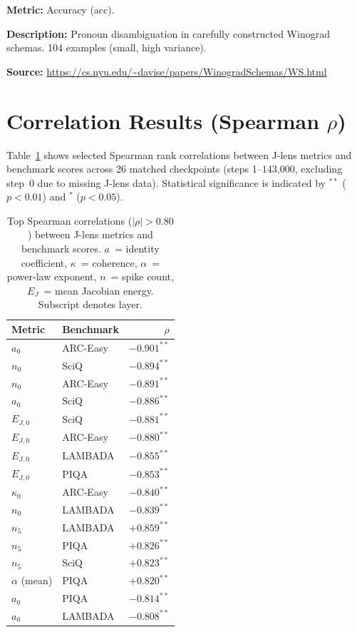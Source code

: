 \documentclass[11pt,a4paper]{article}
\begin{document}
\textbf{Metric:} Accuracy (acc).

\textbf{Description:} Pronoun disambiguation in carefully constructed Winograd schemas. 104 examples (small, high variance).

\textbf{Source:} \url{https://cs.nyu.edu/~davise/papers/WinogradSchemas/WS.html}

\section{Correlation Results (Spearman $\rho$)}

Table~\ref{tab:correlations} shows selected Spearman rank correlations between J-lens metrics and benchmark scores across 26 matched checkpoints (steps 1--143,000, excluding step~0 due to missing J-lens data). Statistical significance is indicated by $^{**}$ ($p < 0.01$) and $^{*}$ ($p < 0.05$).

\begin{table}[H]
\centering
\caption{Top Spearman correlations ($|\rho| > 0.80$) between J-lens metrics and benchmark scores. $a$~= identity coefficient, $\kappa$~= coherence, $\alpha$~= power-law exponent, $n$~= spike count, $E_J$~= mean Jacobian energy. Subscript denotes layer.}
\label{tab:correlations}
\begin{tabular}{llr}
\toprule
Metric & Benchmark & $\rho$ \\
\midrule
$a_0$      & ARC-Easy      & $-0.901^{**}$ \\
$n_0$      & SciQ          & $-0.894^{**}$ \\
$n_0$      & ARC-Easy      & $-0.891^{**}$ \\
$a_0$      & SciQ          & $-0.886^{**}$ \\
$E_{J,0}$  & SciQ          & $-0.881^{**}$ \\
$E_{J,0}$  & ARC-Easy      & $-0.880^{**}$ \\
$E_{J,0}$  & LAMBADA       & $-0.855^{**}$ \\
$E_{J,0}$  & PIQA          & $-0.853^{**}$ \\
$\kappa_0$ & ARC-Easy      & $-0.840^{**}$ \\
$n_0$      & LAMBADA       & $-0.839^{**}$ \\
$n_5$      & LAMBADA       & $+0.859^{**}$ \\
$n_5$      & PIQA          & $+0.826^{**}$ \\
$n_5$      & SciQ          & $+0.823^{**}$ \\
$\alpha$ (mean) & PIQA      & $+0.820^{**}$ \\
$a_0$      & PIQA          & $-0.814^{**}$ \\
$a_0$      & LAMBADA       & $-0.808^{**}$ \\
\bottomrule
\end{tabular}
\end{table}
\end{document}

